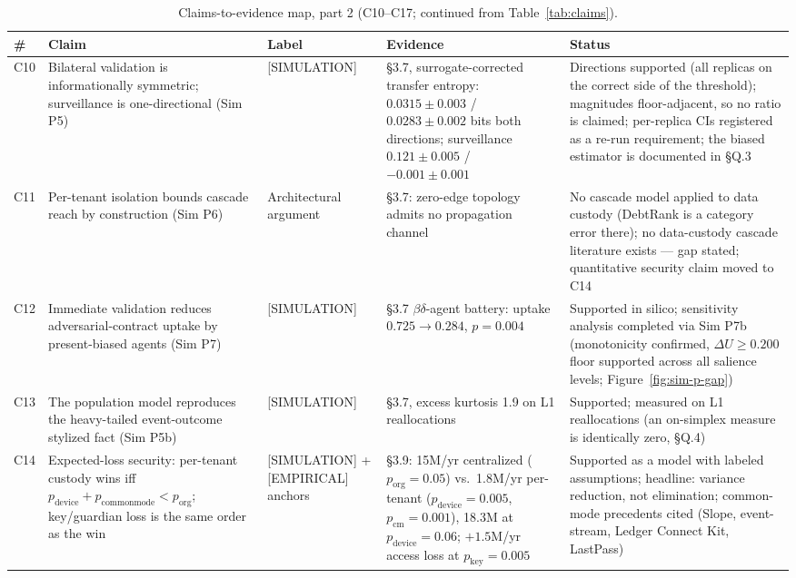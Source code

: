 \documentclass[11pt,twocolumn]{article}
\begin{document}
\begin{table}[t]
\centering
\caption{Claims-to-evidence map, part 2 (C10--C17; continued from Table~\ref{tab:claims}).}
\label{tab:claims2}
\scriptsize
\setlength{\tabcolsep}{4pt}
\begin{tabular}{@{}l p{4.35cm} p{2.3cm} p{3.95cm} p{5.35cm}@{}}
\toprule
\# & Claim & Label & Evidence & Status \\
\midrule
C10 & Bilateral validation is informationally symmetric; surveillance is one-directional (Sim P5) & [SIMULATION] & \S3.7, surrogate-corrected transfer entropy: $0.0315 \pm 0.003$ / $0.0283 \pm 0.002$ bits both directions; surveillance $0.121 \pm 0.005$ / $-0.001 \pm 0.001$ & Directions supported (all replicas on the correct side of the threshold); magnitudes floor-adjacent, so no ratio is claimed; per-replica CIs registered as a re-run requirement; the biased estimator is documented in \S{}Q.3 \\
C11 & Per-tenant isolation bounds cascade reach by construction (Sim P6) & Architectural argument & \S3.7: zero-edge topology admits no propagation channel & No cascade model applied to data custody (DebtRank is a category error there); no data-custody cascade literature exists --- gap stated; quantitative security claim moved to C14 \\
C12 & Immediate validation reduces adversarial-contract uptake by present-biased agents (Sim P7) & [SIMULATION] & \S3.7 $\beta\delta$-agent battery: uptake $0.725 \to 0.284$, $p = 0.004$ & Supported in silico; sensitivity analysis completed via Sim P7b (monotonicity confirmed, $\Delta U \ge 0.200$ floor supported across all salience levels; Figure~\ref{fig:sim-p-gap}) \\
C13 & The population model reproduces the heavy-tailed event-outcome stylized fact (Sim P5b) & [SIMULATION] & \S3.7, excess kurtosis 1.9 on L1 reallocations & Supported; measured on L1 reallocations (an on-simplex measure is identically zero, \S Q.4) \\
C14 & Expected-loss security: per-tenant custody wins iff $p_{\mathrm{device}} + p_{\mathrm{commonmode}} < p_{\mathrm{org}}$; key/guardian loss is the same order as the win & [SIMULATION] + [EMPIRICAL] anchors & \S3.9: 15M/yr centralized ($p_{\mathrm{org}} = 0.05$) vs.\ 1.8M/yr per-tenant ($p_{\mathrm{device}} = 0.005$, $p_{\mathrm{cm}} = 0.001$), 18.3M at $p_{\mathrm{device}} = 0.06$; $+1.5$M/yr access loss at $p_{\mathrm{key}} = 0.005$ & Supported as a model with labeled assumptions; headline: variance reduction, not elimination; common-mode precedents cited (Slope, event-stream, Ledger Connect Kit, LastPass) \\

\end{tabular}
\end{table}
\end{document}
